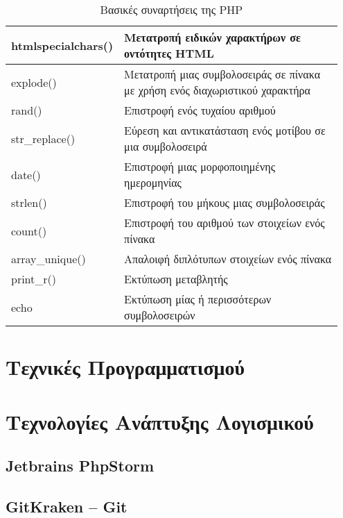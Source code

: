 \begin{table}[h]
	\caption{Βασικές συναρτήσεις της PHP}
	\label{tbl:php_basic_functions}
	\begin{tabular}{|p{0.2\linewidth}|p{0.75\linewidth}|}
		\hline
		htmlspecialchars() & Μετατροπή ειδικών χαρακτήρων σε οντότητες HTML \\ \hline
		explode() & Μετατροπή μιας συμβολοσειράς σε πίνακα με χρήση ενός διαχωριστικού χαρακτήρα \\ \hline
		rand() & Επιστροφή ενός τυχαίου αριθμού \\ \hline
		str\_replace() & Εύρεση και αντικατάσταση ενός μοτίβου σε μια συμβολοσειρά \\ \hline
		date() & Επιστροφή μιας μορφοποιημένης ημερομηνίας \\ \hline
		strlen() & Επιστροφή του μήκους μιας συμβολοσειράς \\ \hline
		count() & Επιστροφή του αριθμού των στοιχείων ενός πίνακα \\ \hline
		array\_unique() & Απαλοιφή διπλότυπων στοιχείων ενός πίνακα \\ \hline
		print\_r() & Εκτύπωση μεταβλητής \\ \hline
		echo & Εκτύπωση μίας ή περισσότερων συμβολοσειρών \\ \hline
	\end{tabular}
\end{table}

\section{Τεχνικές Προγραμματισμού}

\section{Τεχνολογίες Ανάπτυξης Λογισμικού}

\subsection{Jetbrains PhpStorm}

\subsection{GitKraken – Git}
